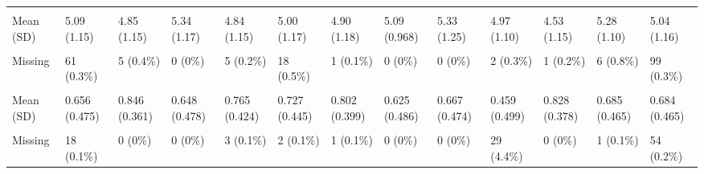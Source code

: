 \documentclass[
  single column]{article}
\begin{document}
\begin{landscape}
\begin{longtable}[t]{lllllllllllll}
\addlinespace
\cellcolor{gray!10}{Openness (Personality Trait)} & \cellcolor{gray!10}{} & \cellcolor{gray!10}{} & \cellcolor{gray!10}{} & \cellcolor{gray!10}{} & \cellcolor{gray!10}{} & \cellcolor{gray!10}{} & \cellcolor{gray!10}{} & \cellcolor{gray!10}{} & \cellcolor{gray!10}{} & \cellcolor{gray!10}{} & \cellcolor{gray!10}{} & \cellcolor{gray!10}{}\\
Mean (SD) & 5.09 (1.15) & 4.85 (1.15) & 5.34 (1.17) & 4.84 (1.15) & 5.00 (1.17) & 4.90 (1.18) & 5.09 (0.968) & 5.33 (1.25) & 4.97 (1.10) & 4.53 (1.15) & 5.28 (1.10) & 5.04 (1.16)\\
\cellcolor{gray!10}{Median [Min, Max]} & \cellcolor{gray!10}{5.25 [1.00, 7.00]} & \cellcolor{gray!10}{4.75 [1.00, 7.00]} & \cellcolor{gray!10}{5.42 [1.50, 7.00]} & \cellcolor{gray!10}{5.00 [1.00, 7.00]} & \cellcolor{gray!10}{5.00 [1.00, 7.00]} & \cellcolor{gray!10}{5.00 [1.75, 7.00]} & \cellcolor{gray!10}{5.25 [2.75, 7.00]} & \cellcolor{gray!10}{5.50 [1.75, 7.00]} & \cellcolor{gray!10}{5.00 [1.25, 7.00]} & \cellcolor{gray!10}{4.50 [1.00, 7.00]} & \cellcolor{gray!10}{5.50 [1.25, 7.00]} & \cellcolor{gray!10}{5.00 [1.00, 7.00]}\\
Missing & 61 (0.3\%) & 5 (0.4\%) & 0 (0\%) & 5 (0.2\%) & 18 (0.5\%) & 1 (0.1\%) & 0 (0\%) & 0 (0\%) & 2 (0.3\%) & 1 (0.2\%) & 6 (0.8\%) & 99 (0.3\%)\\
\cellcolor{gray!10}{Parental Status (Yes/No)} & \cellcolor{gray!10}{} & \cellcolor{gray!10}{} & \cellcolor{gray!10}{} & \cellcolor{gray!10}{} & \cellcolor{gray!10}{} & \cellcolor{gray!10}{} & \cellcolor{gray!10}{} & \cellcolor{gray!10}{} & \cellcolor{gray!10}{} & \cellcolor{gray!10}{} & \cellcolor{gray!10}{} & \cellcolor{gray!10}{}\\
\addlinespace
Mean (SD) & 0.656 (0.475) & 0.846 (0.361) & 0.648 (0.478) & 0.765 (0.424) & 0.727 (0.445) & 0.802 (0.399) & 0.625 (0.486) & 0.667 (0.474) & 0.459 (0.499) & 0.828 (0.378) & 0.685 (0.465) & 0.684 (0.465)\\
\cellcolor{gray!10}{Median [Min, Max]} & \cellcolor{gray!10}{1.00 [0, 1.00]} & \cellcolor{gray!10}{1.00 [0, 1.00]} & \cellcolor{gray!10}{1.00 [0, 1.00]} & \cellcolor{gray!10}{1.00 [0, 1.00]} & \cellcolor{gray!10}{1.00 [0, 1.00]} & \cellcolor{gray!10}{1.00 [0, 1.00]} & \cellcolor{gray!10}{1.00 [0, 1.00]} & \cellcolor{gray!10}{1.00 [0, 1.00]} & \cellcolor{gray!10}{0 [0, 1.00]} & \cellcolor{gray!10}{1.00 [0, 1.00]} & \cellcolor{gray!10}{1.00 [0, 1.00]} & \cellcolor{gray!10}{1.00 [0, 1.00]}\\
Missing & 18 (0.1\%) & 0 (0\%) & 0 (0\%) & 3 (0.1\%) & 2 (0.1\%) & 1 (0.1\%) & 0 (0\%) & 0 (0\%) & 29 (4.4\%) & 0 (0\%) & 1 (0.1\%) & 54 (0.2\%)\\

\end{longtable}
\end{landscape}
\end{document}
